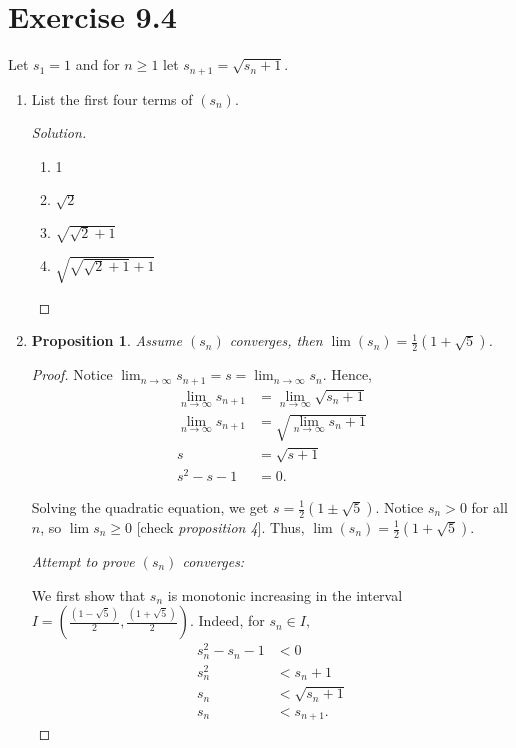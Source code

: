 \documentclass{article}
\newtheorem{proposition}[thm]{Proposition}
\begin{document}
\section*{Exercise 9.4}
Let $s_1=1$ and for $n\ge1$ let $s_{n+1}=\sqrt{s_n+1}$.
\begin{enumerate}[label=(\alph*)]
    \item List the first four terms of $(s_n)$.
    \begin{proof}[Solution]\indent
        \begin{enumerate}[label=\arabic*.]
            \item 1
            \item $\sqrt{2}$
            \item $\sqrt{\sqrt{2}+1}$
            \item $\sqrt{\sqrt{\sqrt{2}+1}+1}$
        \end{enumerate}
    \end{proof}

    \item
    \begin{proposition}
        Assume $(s_n)$ converges, then $\lim (s_n) = \frac{1}{2}\left(1+\sqrt{5}\right)$.
    \end{proposition}
    \begin{proof}
        Notice $\lim_{n\rightarrow\infty}s_{n+1} = s = \lim_{n\rightarrow\infty}s_n$. Hence, 
        \begin{align*}
            \lim_{n\rightarrow\infty} s_{n+1} & = \lim_{n\rightarrow\infty} \sqrt{s_n+1} \\
            \lim_{n\rightarrow\infty} s_{n+1} & = \sqrt{\lim_{n\rightarrow\infty} s_n+1} \\ 
            s & = \sqrt{s+1} \\
            s^2 - s - 1 & = 0.
        \end{align*}

        Solving the quadratic equation, we get $s = \frac{1}{2}\left(1\pm\sqrt{5}\right)$.
        Notice $s_n > 0$ for all $n$, so $\lim s_n\ge 0$ [check \emph{proposition 4}]. Thus, 
        $\lim (s_n) = \frac{1}{2}\left(1+\sqrt{5}\right)$.

        \emph{Attempt to prove $(s_n)$ converges:}

        We first show that $s_n$ is monotonic increasing in the interval 
        $I = \left(\frac{\left(1-\sqrt{5}\right)}{2}, \frac{\left(1+\sqrt{5}\right)}{2}\right)$. 
        Indeed, for $s_n\in I,$
        \begin{align*}
            s_n^2 - s_n - 1 & < 0 \\
            s_n^2 & < s_n + 1 \\
            s_n & < \sqrt{s_n + 1} \\
            s_n & < s_{n+1}.
        \end{align*}


\end{proof}
\end{enumerate}
\end{document}
